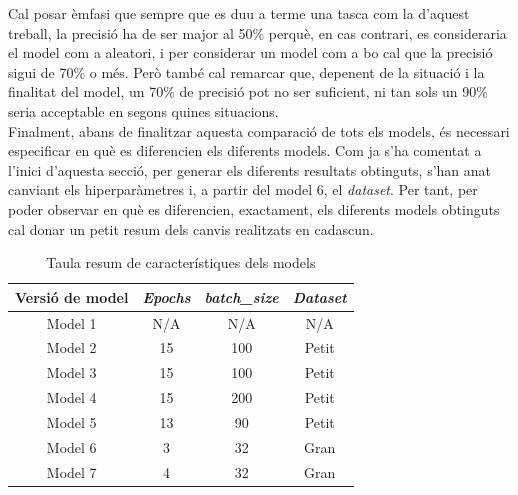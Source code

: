 \documentclass[a4paper,12pt]{report}
\begin{document}
Cal posar èmfasi que sempre que es duu a terme una tasca com la d'aquest treball, la precisió ha de ser major al 50\% perquè, en cas contrari, es consideraria el model com a aleatori, i per considerar un model com a bo cal que la precisió sigui de 70\% o més. Però també cal remarcar que, depenent de la situació i la finalitat del model, un 70\% de precisió pot no ser suficient, ni tan sols un 90\% seria acceptable en segons quines situacions.\\
Finalment, abans de finalitzar aquesta comparació de tots els models, és necessari especificar en què es diferencien els diferents models. Com ja s'ha comentat a l'inici d'aquesta secció, per generar els diferents resultats obtinguts, s'han anat canviant els hiperparàmetres i, a partir del model 6, el \textit{dataset}. Per tant, per poder observar en què es diferencien, exactament, els diferents models obtinguts cal donar un petit resum dels canvis realitzats en cadascun.
\begin{table}[h]
    \centering
    \begin{tabular}{|c|c|c|c|}
        \hline
        \hline Versió de model & \textit{Epochs} & \textit{batch\_size} & \textit{Dataset}\\
        \hline
         Model 1 & N/A & N/A & N/A  \\
         \hline
         Model 2 & 15 & 100 & Petit \\
         \hline
         Model 3 & 15 & 100 & Petit \\
         \hline
         Model 4 & 15 & 200 & Petit \\
         \hline
         Model 5 & 13 & 90 & Petit \\
         \hline
         Model 6 & 3 & 32 & Gran \\
         \hline
         Model 7 & 4 & 32 & Gran \\
         \hline
    \end{tabular}
    \caption{Taula resum de característiques dels models}
    \label{tab:caractsModels}
\end{table}
\end{document}
